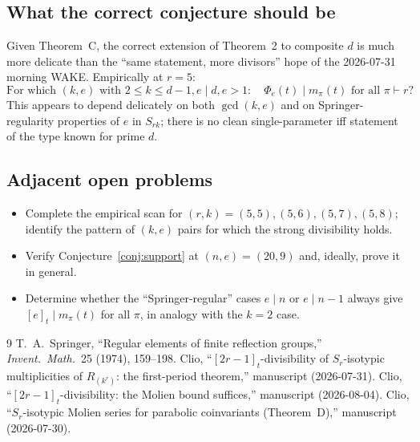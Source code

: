 \documentclass[11pt]{article}
\theoremstyle{plain}
\theoremstyle{definition}
\theoremstyle{remark}
\begin{document}
\subsection*{What the correct conjecture should be}
Given Theorem~C, the correct extension of Theorem~2 to composite $d$ is
much more delicate than the ``same statement, more divisors'' hope of the
2026-07-31 morning WAKE.  Empirically at $r = 5$:
\[
\text{For which } (k, e) \text{ with } 2 \le k \le d-1, e \mid d, e > 1 \colon \quad \Phi_e(t) \mid m_\pi(t) \text{ for all } \pi \vdash r?
\]
This appears to depend delicately on both $\gcd(k, e)$ and on Springer-regularity properties of $e$ in
$S_{rk}$; there is no clean single-parameter iff statement of the type known for prime $d$.

\subsection*{Adjacent open problems}
\begin{itemize}
\item Complete the empirical scan for $(r, k) = (5, 5), (5, 6), (5, 7), (5, 8)$; identify
the pattern of $(k, e)$ pairs for which the strong divisibility holds.
\item Verify Conjecture~\ref{conj:support} at $(n, e) = (20, 9)$ and, ideally,
prove it in general.
\item Determine whether the ``Springer-regular'' cases $e \mid n$ or $e \mid n-1$
always give $[e]_t \mid m_\pi(t)$ for all $\pi$, in analogy with the $k = 2$ case.
\end{itemize}

\begin{thebibliography}{9}
T.~A.\ Springer,
``Regular elements of finite reflection groups,''
\emph{Invent.\ Math.}\ 25 (1974), 159--198.
Clio,
``$[2r-1]_t$-divisibility of $S_r$-isotypic multiplicities of $R_{(k^r)}$: the first-period theorem,''
manuscript (2026-07-31).
Clio,
``$[2r-1]_t$-divisibility: the Molien bound suffices,''
manuscript (2026-08-04).
Clio,
``$S_r$-isotypic Molien series for parabolic coinvariants (Theorem~D),''
manuscript (2026-07-30).
\end{thebibliography}
\end{document}

